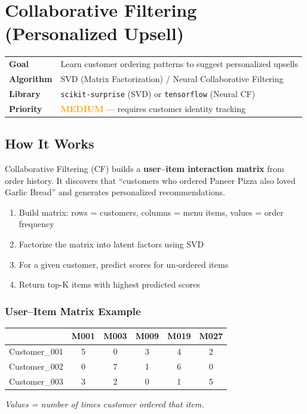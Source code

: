 \documentclass[12pt, a4paper]{article}
\begin{document}
\newpage
\section{Collaborative Filtering (Personalized Upsell)}

\begin{infobox}
\begin{tabularx}{\textwidth}{@{}lX@{}}
\textbf{Goal}       & Learn customer ordering patterns to suggest personalized upsells \\
\textbf{Algorithm}  & SVD (Matrix Factorization) / Neural Collaborative Filtering \\
\textbf{Library}    & \texttt{scikit-surprise} (SVD) or \texttt{tensorflow} (Neural CF) \\
\textbf{Priority}   & \textcolor{orange}{\textbf{MEDIUM}} --- requires customer identity tracking \\
\end{tabularx}
\end{infobox}


\subsection{How It Works}

Collaborative Filtering (CF) builds a \textbf{user--item interaction matrix} from order history. It discovers that ``customers who ordered Paneer Pizza also loved Garlic Bread'' and generates personalized recommendations.

\begin{enumerate}[nosep]
    \item Build matrix: rows = customers, columns = menu items, values = order frequency
    \item Factorize the matrix into latent factors using SVD
    \item For a given customer, predict scores for un-ordered items
    \item Return top-K items with highest predicted scores
\end{enumerate}

\subsubsection{User--Item Matrix Example}
\begin{center}
\begin{tabular}{lccccc}
\toprule
              & M001 & M003 & M009 & M019 & M027 \\
\midrule
Customer\_001 & 5    & 0    & 3    & 4    & 2    \\
Customer\_002 & 0    & 7    & 1    & 6    & 0    \\
Customer\_003 & 3    & 2    & 0    & 1    & 5    \\
\bottomrule
\end{tabular}
\end{center}
\textit{Values = number of times customer ordered that item.}
\end{document}
